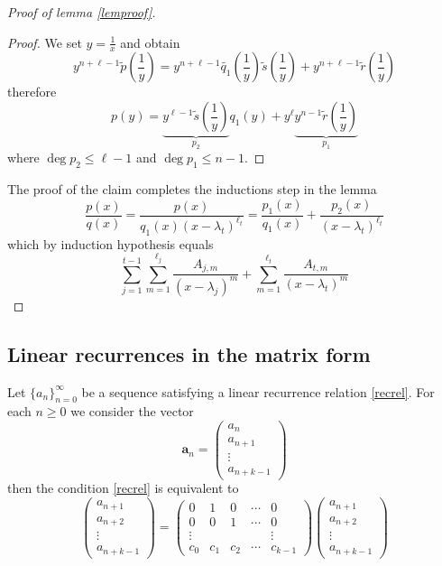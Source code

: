 \begin{proof}[Proof of lemma \ref{lemproof}]
\begin{proof}
We set $y=\frac{1}{x}$ and obtain
$$
y^{n+\ell -1}\tilde{p}\left( \frac{1}{y} \right)=y^{n+\ell -1} \tilde{q_{1}}\left( \frac{1}{y} \right)\tilde{s}\left( \frac{1}{y} \right)+ y^{n+\ell -1}\tilde{r}\left( \frac{1}{y} \right)
$$
therefore
$$
p(y)=\underbrace{ y^{\ell -1}\tilde{s}\left( \frac{1}{y} \right) }_{ p_{2} }q_{1}(y)+y^{\ell}\underbrace{ y^{n-1}\tilde{r}\left( \frac{1}{y} \right) }_{ p_{1} }
$$
where $\deg p_{2}\le \ell -1$ and $\deg p_{1} \le n-1$. 
\end{proof}
The proof of the claim completes the inductions step in the lemma 
$$
\frac{p(x)}{q(x)}=\frac{p(x)}{q_{1}(x)(x-\lambda _{t})^{\ell _{t}}}=\frac{p_{1}(x)}{q_{1}(x)}+\frac{p_{2}(x)}{(x-\lambda _{t})^{\ell _{t}}}
$$
which by induction hypothesis equals
$$
\sum_{j=1}^{t-1} \sum_{m=1}^{\ell _{j}} \frac{A_{j,m}}{(x-\lambda _{j})^{m}}+\sum_{m=1}^{\ell _{t}} \frac{A_{t,m}}{(x-\lambda _{t})^{m}}  
$$
\end{proof}

\subsection{Linear recurrences in the matrix form}

Let $\{ a_{n} \}_{n=0}^{\infty}$ be a sequence satisfying a linear recurrence relation \ref{recrel}. For each $n\ge 0$ we consider the vector 
$$
\boldsymbol{a}_{n}=\begin{pmatrix}
a_{n} \\
a_{n+1} \\
\vdots \\
a_{n+k-1}
\end{pmatrix}
$$
then the condition \ref{recrel} is equivalent to
$$
\begin{pmatrix}
a_{n+1} \\
a_{n+2} \\
\vdots \\
a_{n+k-1} 
\end{pmatrix}=\begin{pmatrix}
0 & 1 & 0 & \cdots & 0 \\
0 & 0 & 1 & \cdots & 0 \\
\vdots &  &  &  & \vdots \\
c_{0} & c_{1} & c_{2} & \cdots & c_{k-1}
\end{pmatrix}\begin{pmatrix}
a_{n+1} \\
a_{n+2} \\
\vdots \\
a_{n+k-1} 
\end{pmatrix}
$$

